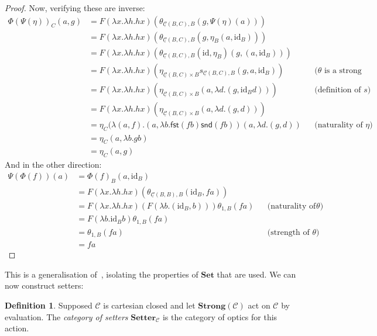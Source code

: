 \documentclass[11pt,a4paper]{article}
\theoremstyle{plain}
\theoremstyle{definition}
\newtheorem{definition}[theorem]{Definition}
\newcommand{\C}{\mathscr{C}}
\newcommand{\homC}{\underline{\C}}
\newcommand{\Set}{\mathbf{Set}}
\newcommand{\Setter}{\mathbf{Setter}}
\newcommand{\Strong}{\mathbf{Strong}}
\newcommand{\id}{\mathrm{id}}
\begin{document}
\begin{proof}
  Now, verifying these are inverse:
  \begin{align*}
    \Phi(\Psi(\eta))_C (a,g)
    &= F(\lambda x. \lambda h. h x)(\theta_{\homC(B, C), B}(g, \Psi(\eta)(a))) \\
    &= F(\lambda x. \lambda h. h x)(\theta_{\homC(B, C), B}(g, \eta_B(a, \id_B))) \\
    &= F(\lambda x. \lambda h. h x)(\theta_{\homC(B, C), B}(\id, \eta_B)(g, (a, \id_B))) \\
    &= F(\lambda x. \lambda h. h x)(\eta_{\homC(B, C) \times B} s_{\homC(B, C), B}(g, a, \id_B)) && \text{($\theta$ is a strong transformation)}\\
    &= F(\lambda x. \lambda h. h x)(\eta_{\homC(B, C) \times B} (a, \lambda d. (g, \id_B d)) ) && \text{(definition of $s$)}\\
    &= F(\lambda x. \lambda h. h x)(\eta_{\homC(B, C) \times B} (a, \lambda d. (g, d)) ) \\
    &= \eta_{C}(\lambda (a, f). (a, \lambda b. \mathsf{fst}(f b)\mathsf{snd}(f b)) (a, \lambda d. (g, d)) && \text{(naturality of $\eta$)}\\
    &= \eta_{C}(a, \lambda b. g b) \\
    &= \eta_{C}(a, g)
  \end{align*}
  And in the other direction:
  \begin{align*}
    \Psi(\Phi(f))(a)
    &= \Phi(f)_B(a, \id_B) \\
    &= F(\lambda x. \lambda h. h x)(\theta_{\homC(B, B), B}(\id_B, f a))\\
    &= F(\lambda x. \lambda h. h x)(F(\lambda b. (\id_B, b)))\theta_{1, B}(f a) && \text{(naturality of $\theta$)}\\
    &= F(\lambda b. \id_B b)\theta_{1, B}(f a)\\
    &= \theta_{1, B}(f a) && \text{(strength of $\theta$)}\\
    &= f a
  \end{align*}
\end{proof}

This is a generalisation of~\cite[Proposition 2.2]{SecondOrderFunctionals}, isolating the properties of $\Set$ that are used. We can now construct setters:

\begin{definition}
  Supposed $\C$ is cartesian closed and let $\Strong(\C)$ act on $\C$ by evaluation. The \emph{category of setters} $\Setter_\C$ is the category of optics for this action.
\end{definition}
\end{document}
